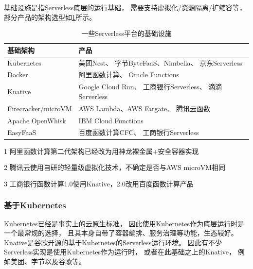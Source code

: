 基础设施是指Serverless底层的运行基础，
需要支持虚拟化/资源隔离/扩缩容等，
部分产品的架构选型如\cref{table:serverless-infras}所示。

\begin{table}[h!]
\centering
\begin{threeparttable}
    \begin{tabularx}{\textwidth}{|l|X|}
        \toprule
        \textbf{基础架构} & \textbf{产品} \\
        \midrule
        Kubernetes & 美团Nest\cite{meituan_serverless_nest, meituan_serverless_2}、
        字节ByteFaaS\cite{bytedance_faas}、Nimbella\cite{nimbella_k8s}、
        京东Serverless\cite{jd_serverless, jd_serverless_2} \\
        \hline
        Docker & 阿里函数计算\cite{aliyun_faas_arch_2}\tnote{1}、
        Oracle Functions\cite{overview_oracle_functions} \\
        \hline
        Knative & Google Cloud Run\cite{gcr_knative}、
        工商银行Serverless\cite{icbc_faas_arch}\tnote{1}、
        滴滴Serverless\cite{didi_serverless}  \\
        \hline
        Firecracker/microVM & AWS Lambda、AWS Fargate\cite{firecracker_home}、
        腾讯云函数\cite{tecent_faas_cold_start, tecent_serverless}\tnote{2} \\
        \hline
        Apache OpenWhisk & IBM Cloud Functions\cite{how_ibm_cloud_functions_works} \\
        \hline
        EasyFaaS & 百度函数计算CFC\cite{baidu_serverless_arch}、
        工商银行Serverless\cite{icbc_faas_arch} \\
        \bottomrule
    \end{tabularx}
\begin{tablenotes}
    \item[1] {\footnotesize 阿里函数计算第二代架构已经改为用神龙裸金属+安全容器实现\cite{aliyun_faas_arch_2}}
    \item[2] {\footnotesize 腾讯云使用自研的轻量级虚拟化技术，不确定是否与AWS microVM相同}
    \item[3] {\footnotesize 工商银行函数计算1.0使用Knative，2.0改用百度函数计算产品}
\end{tablenotes}
\end{threeparttable}
\caption{一些Serverless平台的基础设施}
\label{table:serverless-infras}
\end{table}

\subsubsection{基于Kubernetes}
Kubernetes已经是事实上的云原生标准，
因此使用Kubernetes作为底层运行时是一个最常规的选择，
且其本身自带了容器编排、服务治理等功能，生态较好。
Knative是谷歌开源的基于Kubernetes的Serverless运行环境。
因此有不少Serverless实现是使用Kubernetes作为运行时，
或者在此基础之上的Knative，
例如美团、字节以及谷歌等。

